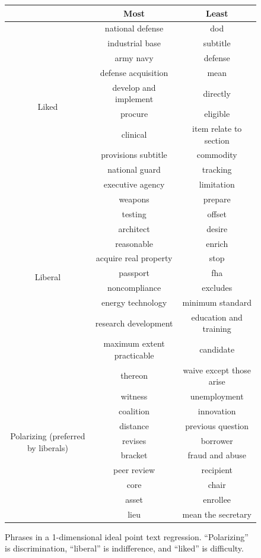 \begin{figure}
  \begin{tabular}{|c|c|c|}
    \hline
    & Most & Least \\
    \hline
    \multirow{10}{*}{Liked} & national defense & dod \\
    & industrial base  & subtitle  \\
    & army navy & defense     \\
    & defense acquisition & mean \\
    & develop and implement & directly \\
    & procure & eligible       \\
    & clinical & item relate to section \\
    & provisions subtitle & commodity \\
    & national guard & tracking \\
    & executive agency & limitation \\

    \hline
    \multirow{10}{*}{Liberal} & weapons & prepare \\
    & testing & offset \\
    & architect & desire \\
    & reasonable & enrich \\
    & acquire real property & stop \\
    & passport & fha \\
    & noncompliance & excludes \\
    & energy technology & minimum standard \\
    & research development & education and training \\
    & maximum extent practicable & candidate \\
    \hline
    
    \hline
    \multirow{10}{*}{Polarizing (preferred by liberals)}
    & thereon & waive except those arise \\
	     & witness & unemployment \\
	     & coalition & innovation \\
	     & distance & previous question \\
	     & revises & borrower \\
	     & bracket & fraud and abuse \\
	     & peer review & recipient \\
	     & core & chair \\
	     & asset & enrollee \\
	     & lieu & mean the secretary \\
  \hline
  \end{tabular}
  \caption{Phrases in a 1-dimensional ideal point text regression.  ``Polarizing'' is discrimination, ``liberal'' is indifference, and ``liked'' is difficulty.}
  \label{table:ip_text_regression_sample_words}
\end{figure}

